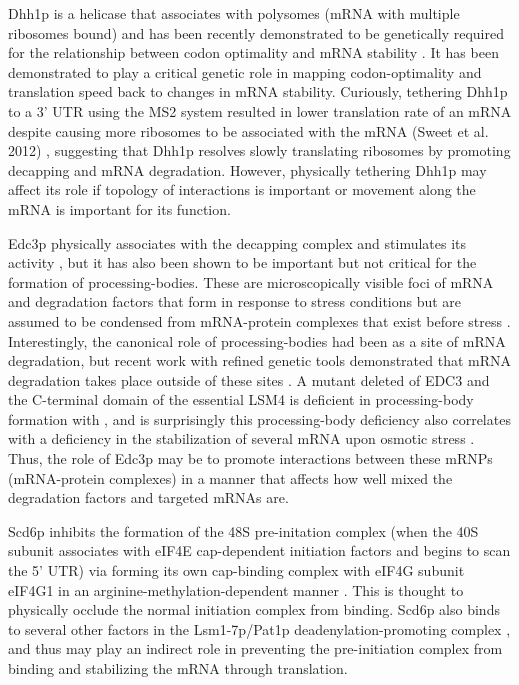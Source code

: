 Dhh1p is a helicase that associates with polysomes (mRNA
with multiple ribosomes bound) and has been recently demonstrated to
be genetically required for the relationship between codon optimality
and mRNA stability 
\parencite{radhakrishnan2016dead,presnyak2015codon,sweet2012dead}. 
It has been demonstrated to play a critical
genetic role in mapping codon-optimality and translation speed back to
changes in mRNA stability. Curiously, tethering Dhh1p to a 3’ UTR
using the MS2 system resulted in lower translation rate of an mRNA
despite causing more ribosomes to be associated with the mRNA
(Sweet et al. 2012)
, suggesting that Dhh1p resolves slowly translating
ribosomes by promoting decapping and mRNA degradation.  
However, physically tethering Dhh1p may affect its role if
topology of interactions is important or movement along the mRNA
is important for its function.


Edc3p
physically associates with the decapping complex and stimulates its
activity \parencite{nissan2010decapping}, 
but it has also been shown to be
important \parencite{decker2007edc3p,huch2016decapping} but not critical 
\parencite{rao2017numerous}
for the formation of processing-bodies. 
These are
microscopically visible foci of mRNA and degradation factors that form
in response to stress conditions but are assumed to be condensed from
mRNA-protein complexes that exist before stress 
\parencite{sheth2003decapping,lui2014granules,rao2017numerous}. 
Interestingly, the
canonical role of processing-bodies had been as a site of mRNA
degradation, but recent work with refined genetic tools demonstrated
that mRNA degradation takes place outside of these sites 
\parencite{tutucci2017improved}. 
A mutant deleted of EDC3 and the C-terminal domain of the
essential LSM4 is deficient in processing-body formation with , and is
surprisingly this processing-body deficiency also correlates with a
deficiency in the stabilization of several mRNA upon osmotic stress
\parencite{huch2017mrna}. 
Thus, the role of Edc3p may be to promote
interactions between these mRNPs (mRNA-protein complexes) in a manner
that affects how well mixed the degradation factors and targeted mRNAs
are.  

Scd6p inhibits the formation of the 48S pre-initation complex
(when the 40S subunit associates with eIF4E cap-dependent initiation
factors and begins to scan the 5’ UTR) via forming its own cap-binding
complex with eIF4G subunit eIF4G1 in an arginine-methylation-dependent
manner 
\parencite{rajyaguru2012scd6,poornima2016arginine}. 
This is thought
to physically occlude the normal initiation complex from binding.
Scd6p also binds to several other factors in the Lsm1-7p/Pat1p
deadenylation-promoting complex 
\parencite{nissan2010decapping}
, and thus may
play an indirect role in preventing the pre-initiation complex from
binding and stabilizing the mRNA through translation.  

